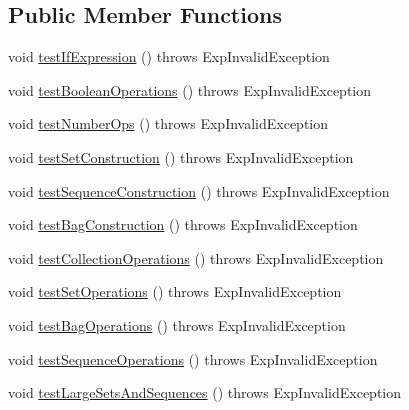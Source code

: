 \subsection*{Public Member Functions}
\begin{DoxyCompactItemize}
\item 
void \hyperlink{classorg_1_1tzi_1_1use_1_1uml_1_1ocl_1_1expr_1_1_exp_std_op_test_ade64f5c34bf28cb4cf864560ad4c7c1f}{test\-If\-Expression} ()  throws Exp\-Invalid\-Exception 
\item 
void \hyperlink{classorg_1_1tzi_1_1use_1_1uml_1_1ocl_1_1expr_1_1_exp_std_op_test_a076c9bee1efbc0ad1f4d2721f7f25160}{test\-Boolean\-Operations} ()  throws Exp\-Invalid\-Exception 
\item 
void \hyperlink{classorg_1_1tzi_1_1use_1_1uml_1_1ocl_1_1expr_1_1_exp_std_op_test_ad362941bbc3971467a4feee577f05b44}{test\-Number\-Ops} ()  throws Exp\-Invalid\-Exception 
\item 
void \hyperlink{classorg_1_1tzi_1_1use_1_1uml_1_1ocl_1_1expr_1_1_exp_std_op_test_a98b04e7c2720022c7a60416010ac91a5}{test\-Set\-Construction} ()  throws Exp\-Invalid\-Exception 
\item 
void \hyperlink{classorg_1_1tzi_1_1use_1_1uml_1_1ocl_1_1expr_1_1_exp_std_op_test_ac0ea19fb401a277aadd598e83a63660a}{test\-Sequence\-Construction} ()  throws Exp\-Invalid\-Exception 
\item 
void \hyperlink{classorg_1_1tzi_1_1use_1_1uml_1_1ocl_1_1expr_1_1_exp_std_op_test_a4b6b4e483a6aaa6ba86116260e51044d}{test\-Bag\-Construction} ()  throws Exp\-Invalid\-Exception 
\item 
void \hyperlink{classorg_1_1tzi_1_1use_1_1uml_1_1ocl_1_1expr_1_1_exp_std_op_test_a74f6fb53c908051ef5e717ac829876e8}{test\-Collection\-Operations} ()  throws Exp\-Invalid\-Exception 
\item 
void \hyperlink{classorg_1_1tzi_1_1use_1_1uml_1_1ocl_1_1expr_1_1_exp_std_op_test_aba4e78101c82f63fcd5d37f8ab3fbaaf}{test\-Set\-Operations} ()  throws Exp\-Invalid\-Exception 
\item 
void \hyperlink{classorg_1_1tzi_1_1use_1_1uml_1_1ocl_1_1expr_1_1_exp_std_op_test_a2a0943e567eb60f0fc31f1b9685db7a8}{test\-Bag\-Operations} ()  throws Exp\-Invalid\-Exception 
\item 
void \hyperlink{classorg_1_1tzi_1_1use_1_1uml_1_1ocl_1_1expr_1_1_exp_std_op_test_a0a54fbbfaa646f912a2e7cffbeb22a31}{test\-Sequence\-Operations} ()  throws Exp\-Invalid\-Exception 
\item 
void \hyperlink{classorg_1_1tzi_1_1use_1_1uml_1_1ocl_1_1expr_1_1_exp_std_op_test_aa051e0513c948157938b488b445e11ff}{test\-Large\-Sets\-And\-Sequences} ()  throws Exp\-Invalid\-Exception 
\end{DoxyCompactItemize}
